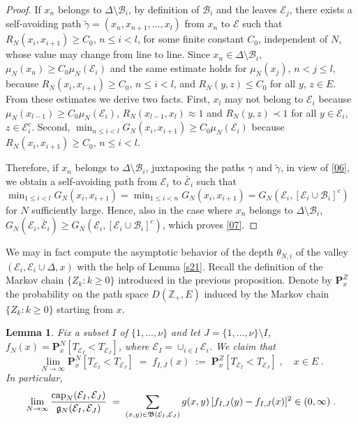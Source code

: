 \documentclass[reqno]{amsart}
\newtheorem{lemma}[theorem]{Lemma}
\begin{document}
\begin{proof}
If $x_n$ belongs to $\Delta\setminus {{\mathcal B}}_i$, by definition of ${{\mathcal B}}_i$ and the leaves ${{\mathcal E}}_j$, there exists a self-avoiding path
$\tilde \gamma = (x_n , x_{n+1}, \dots, x_l)$ from $x_n$ to ${{\mathcal E}}$
such that $R_N(x_i, x_{i+1}) \ge C_0$, $n\le i < l$, for some finite
constant $C_0$, independent of $N$, whose value may change from line
to line. Since $x_n \in \Delta\setminus {{\mathcal B}}_i$, $\mu_N(x_n) \ge C_0
\mu_N({{\mathcal E}}_i)$ and the same estimate holds for $\mu_N(x_j)$, $n<j\le
l$, because $R_N(x_i, x_{i+1}) \ge C_0$, $n\le i < l$, and $R_N(y,z)
\le C_0$ for all $y$, $z\in E$. From these estimates we derive two
facts. First, $x_l$ may not belong to ${{\mathcal E}}_i$ because
$\mu_N(x_{l-1}) \ge C_0 \mu_N({{\mathcal E}}_i)$, $R_N(x_{l-1}, x_l) \approx 1$
and $R_N(y,z) \prec 1$ for all $y\in {{\mathcal E}}_i$, $z\in {{\mathcal E}}^c_i$. Second, $\min_{n\le i <l} G_N(x_i, x_{i+1}) \ge C_0 \mu_N({{\mathcal E}}_i)$ because $R_N(x_i, x_{i+1}) \ge C_0$, $n\le i < l$.

Therefore, if $x_n$ belongs to $\Delta\setminus {{\mathcal B}}_i$, juxtaposing
the paths $\gamma$ and $\tilde \gamma$, in view of \eqref{06}, we
obtain a self-avoiding path from ${{\mathcal E}}_i$ to $\breve{{{\mathcal E}}_i}$ such
that $\min_{1\le i <l} G_N(x_i, x_{i+1}) = \min_{1\le i <n} G_N(x_i,
x_{i+1}) = G_N({{\mathcal E}}_i , [{{\mathcal E}}_i \cup {{\mathcal B}}_i]^c)$ for $N$
sufficiently large. Hence, also in the case where $x_n$ belongs to
$\Delta\setminus {{\mathcal B}}_i$, $G_N({{\mathcal E}}_i , \breve{{{\mathcal E}}_i}) \ge G_N({{\mathcal E}}_i , [{{\mathcal E}}_i \cup {{\mathcal B}}_i]^c)$, which proves \eqref{07}.
\end{proof}

We may in fact compute the asymptotic behavior of the depth
$\theta_{N,i}$ of the valley $({{\mathcal E}}_i, {{\mathcal E}}_i \cup \Delta, x)$ with
the help of Lemma \ref{s21}.  Recall the definition of the Markov
chain $\{Z_k : k\ge 0\}$ introduced in the previous proposition.
Denote by ${{\mathbf P}}^Z_x$ the probability on the path space $D({{\mathbb Z}}_+,
E)$ induced by the Markov chain $\{Z_k : k\ge 0\}$ starting from $x$.

\begin{lemma}
\label{s22}
Fix a subset $I$ of $\{1, \dots, \nu\}$ and let $J=\{1, \dots, \nu\}
\setminus I$, $f_N(x) = {{\mathbf P}}^N_x[T_{{{\mathcal E}}_I} < T_{{{\mathcal E}}_J}]$, where
${{\mathcal E}}_I = \cup_{i\in I} {{\mathcal E}}_i$. We claim that 
\begin{equation*}
\lim_{N\to\infty} {{\mathbf P}}^N_x[T_{{{\mathcal E}}_I} < T_{{{\mathcal E}}_J}] \;=\;
f_{I,J}(x) \;:=\;
{{\mathbf P}}^Z_x[T_{{{\mathcal E}}_I} < T_{{{\mathcal E}}_J}]\;, \quad x\in E\;.
\end{equation*}
In particular,
\begin{equation*}
\lim_{N\to\infty} \frac {{{\rm cap}}_N({{\mathcal E}}_I, {{\mathcal E}}_J)}
{{{\mathfrak g}}_N({{\mathcal E}}_I,{{\mathcal E}}_J)}  \;=\; 
\sum_{(x,y) \in {{\mathfrak B}}({{\mathcal E}}_I, {{\mathcal E}}_J)} g(x,y) 
\, [f_{I,J} (y) - f_{I,J} (x)]^2 
\in (0,\infty)\;.
\end{equation*}
\end{lemma}
\end{document}
